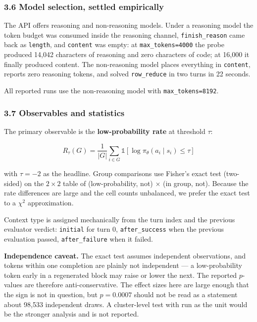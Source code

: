 \documentclass[
  11pt,
]{article}
\begin{document}
\hypertarget{model-selection-settled-empirically}{%
\subsubsection{3.6 Model selection, settled
empirically}\label{model-selection-settled-empirically}}

The API offers reasoning and non-reasoning models. Under a reasoning
model the token budget was consumed inside the reasoning channel,
\texttt{finish\_reason} came back as \texttt{length}, and
\texttt{content} was empty: at \texttt{max\_tokens=4000} the probe
produced 14,042 characters of reasoning and zero characters of code; at
16,000 it finally produced content. The non-reasoning model places
everything in \texttt{content}, reports zero reasoning tokens, and
solved \texttt{row\_reduce} in two turns in 22 seconds.

All reported runs use the non-reasoning model with
\texttt{max\_tokens=8192}.

\hypertarget{observables-and-statistics}{%
\subsubsection{3.7 Observables and
statistics}\label{observables-and-statistics}}

The primary observable is the \textbf{low-probability rate} at threshold
\(\tau\):

\[R_\tau(G) = \frac{1}{|G|} \sum_{i \in G} \mathbb{1}\left[\log \pi_\theta(a_i \mid s_i) \le \tau\right]\]

with \(\tau = -2\) as the headline. Group comparisons use Fisher's exact
test (two-sided) on the \(2 \times 2\) table of (low-probability, not) ×
(in group, not). Because the rate differences are large and the cell
counts unbalanced, we prefer the exact test to a \(\chi^2\)
approximation.

Context type is assigned mechanically from the turn index and the
previous evaluator verdict: \texttt{initial} for turn 0,
\texttt{after\_success} when the previous evaluation passed,
\texttt{after\_failure} when it failed.

\textbf{Independence caveat.} The exact test assumes independent
observations, and tokens within one completion are plainly not
independent --- a low-probability token early in a regenerated block may
raise or lower the next. The reported \(p\)-values are therefore
anti-conservative. The effect sizes here are large enough that the sign
is not in question, but \(p = 0.0007\) should not be read as a statement
about 98,533 independent draws. A cluster-level test with run as the
unit would be the stronger analysis and is not reported.
\end{document}
